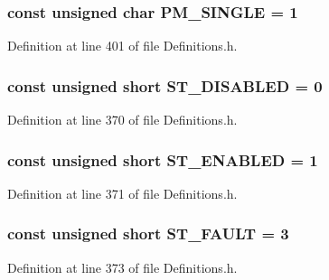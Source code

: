 \subsubsection[{\-P\-M\-\_\-\-S\-I\-N\-G\-L\-E}]{\setlength{\rightskip}{0pt plus 5cm}const unsigned char {\bf \-P\-M\-\_\-\-S\-I\-N\-G\-L\-E} = 1}\label{Definitions_8h_aa32a3590c7c71300bc4e6a921d757d7a}


\-Definition at line 401 of file \-Definitions.\-h.

\subsubsection[{\-S\-T\-\_\-\-D\-I\-S\-A\-B\-L\-E\-D}]{\setlength{\rightskip}{0pt plus 5cm}const unsigned short {\bf \-S\-T\-\_\-\-D\-I\-S\-A\-B\-L\-E\-D} = 0}\label{Definitions_8h_ab033af772db7d5b4df5b1668230846d4}


\-Definition at line 370 of file \-Definitions.\-h.

\subsubsection[{\-S\-T\-\_\-\-E\-N\-A\-B\-L\-E\-D}]{\setlength{\rightskip}{0pt plus 5cm}const unsigned short {\bf \-S\-T\-\_\-\-E\-N\-A\-B\-L\-E\-D} = 1}\label{Definitions_8h_ae1601df22e452da5beea9cdf5a63cdcd}


\-Definition at line 371 of file \-Definitions.\-h.

\subsubsection[{\-S\-T\-\_\-\-F\-A\-U\-L\-T}]{\setlength{\rightskip}{0pt plus 5cm}const unsigned short {\bf \-S\-T\-\_\-\-F\-A\-U\-L\-T} = 3}\label{Definitions_8h_acffa12fb6fe9a25eea79c9b190967edc}


\-Definition at line 373 of file \-Definitions.\-h.

